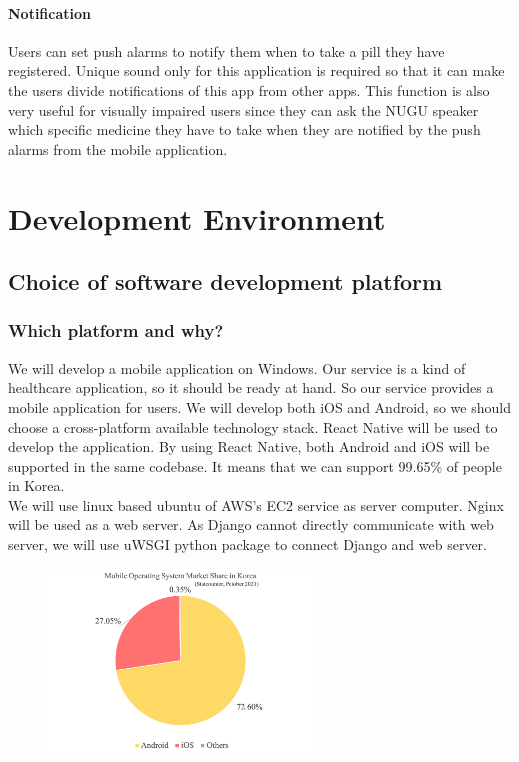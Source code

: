 \documentclass[conference]{IEEEtran}
\begin{document}
\paragraph{Notification} Users can set push alarms to notify them when to take a pill they have registered. Unique sound only for this application is required so that it can make the users divide notifications of this app from other apps. This function is also very useful for visually impaired users since they can ask the NUGU speaker which specific medicine they have to take when they are notified by the push alarms from the mobile application.\\



\section{Development Environment}
\subsection{Choice of software development platform}\label{AA}
\subsubsection{Which platform and why?}
We will develop a mobile application on Windows. Our service is a kind of healthcare application, so it should be ready at hand. So our service provides a mobile application for users. We will develop both iOS and Android, so we should choose a cross-platform available technology stack. React Native will be used to develop the application. By using React Native, both Android and iOS will be supported in the same codebase. It means that we can support 99.65\% of people in Korea. \\
We will use linux based ubuntu of AWS's EC2 service as server computer. Nginx will be used as a web server. As Django cannot directly communicate with web server, we will use uWSGI python package to connect Django and web server. \\
\begin{figure}\centering
\includegraphics[width=7cm]{imagefolder/1.png}
\caption{}
\label{fig:map}
\end{figure}
\end{document}
